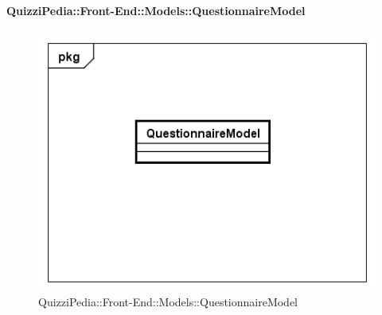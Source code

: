 		\paragraph{QuizziPedia::Front-End::Models::QuestionnaireModel}
		
		\label{QuizziPedia::Front-End::Models::QuestionnaireModel}
		
		\begin{figure}[h]
			\centering
			\includegraphics[scale=0.5,keepaspectratio]{UML/Classi/Front-End/QuizziPedia_Front-end_Models_QuestionnaireModel.png}
			\caption{QuizziPedia::Front-End::Models::QuestionnaireModel}
		\end{figure}
		
